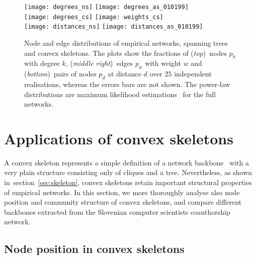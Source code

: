 \documentclass[]{rsif}
\newcommand{\secref}[1]{section~\ref{sec:#1}\xspace}
\begin{document}
\begin{figure}[t]
	\centering\texttt{[image: degrees\_ns]}\textwidth%
	\texttt{[image: degrees\_as\_010199]}\\\textwidth%
	\texttt{[image: degrees\_cs]}\textwidth%
	\texttt{[image: weights\_cs]}\\\textwidth%
	\texttt{[image: distances\_ns]}\textwidth%
	\texttt{[image: distances\_as\_010199]}%
	\caption{\label{fig:skeleton}Node and edge distributions of empirical networks, spanning trees and convex skeletons. The plots show the fractions of (\emph{top})~nodes $p_k$ with degree $k$, (\emph{middle right})~edges $p_w$ with weight $w$ and (\emph{bottom})~pairs of nodes $p_d$ at distance $d$ over $25$ independent realisations, whereas the errors bars are not shown. The power-law distributions are maximum likelihood estimations~\cite{CSN09} for the full networks.} 
\end{figure}

%
%

\section{\label{sec:apps}Applications of convex skeletons}

A convex skeleton represents a simple definition of a network backbone~\cite{HLMSW16,CN17} with a very plain structure consisting only of cliques and a tree. Nevertheless, as shown in~\secref{skeleton}, convex skeletons retain important structural properties of empirical networks. In this section, we more thoroughly analyse also node position and community structure of convex skeletons, and compare different backbones extracted from the Slovenian computer scientists coauthorship network.

\subsection{Node position in convex skeletons}
\end{document}
